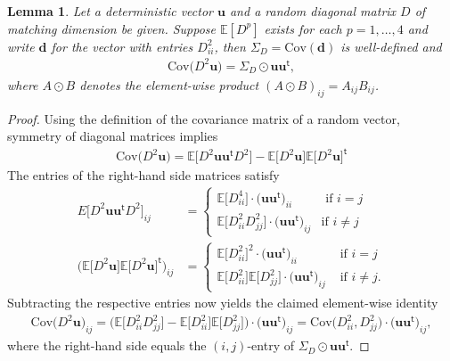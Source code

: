 \documentclass{article}
\newcommand*{\E}{\mathbb{E}} %
\newcommand*{\bfd}{\mathbf{d}}
\newcommand*{\bfu}{\mathbf{u}}
\newcommand*{\tran}{^{\mathsf{t}}}
\newcommand*{\Cov}{\mathrm{Cov}}
\newtheorem{lemma}{Lemma}[section]
\begin{document}
\begin{lemma}
  \label{lem::cov_diag}
  Let a deterministic vector $\bfu$ and a random diagonal matrix $D$ of matching
  dimension be given. Suppose $\E[D^p]$ exists for each $p = 1, \ldots, 4$ and
  write $\bfd$ for the vector with entries $D_{ii}^2$, then $\Sigma_D =
  \Cov(\bfd)$ is well-defined and \begin{align*}
    \Cov\big(D^2 \bfu\big) = \Sigma_D \odot \bfu \bfu\tran,
  \end{align*} where $A \odot B$ denotes the element-wise product $(A \odot
  B)_{ij} = A_{ij} B_{ij}$.
\end{lemma}

\begin{proof}
  Using the definition of the covariance matrix of a random vector, symmetry of
  diagonal matrices implies \begin{align*}
    \Cov\big(D^2 \bfu\big) = \E\big[D^2 \bfu \bfu\tran D^2\big] - \E\big[D^2
    \bfu\big] \E\big[D^2 \bfu\big]\tran
  \end{align*} The entries of the right-hand side matrices satisfy
  \begin{align*}
    E\big[D^2 \bfu \bfu\tran D^2\big]_{ij} &= \begin{cases}
      \E\big[D^4_{ii}\big] \cdot \big(\bfu \bfu\tran\big)_{ii} & \mbox{ if } i =
      j\\
      \E\big[D^2_{ii} D^2_{jj}\big] \cdot \big(\bfu \bfu\tran\big)_{ij} & \mbox{
      if } i \neq j
    \end{cases}\\
    \Big(\E\big[D^2 \bfu\big] \E\big[D^2 \bfu\big]\tran\Big)_{ij} &=
    \begin{cases}
      \E\big[D^2_{ii}\big]^2 \cdot \big(\bfu \bfu\tran\big)_{ii} & \mbox{ if } i
      = j\\
      \E\big[D^2_{ii}\big] \E\big[D^2_{jj}\big] \cdot \big(\bfu
      \bfu\tran\big)_{ij} & \mbox{ if } i \neq j.
    \end{cases}
  \end{align*} Subtracting the respective entries now yields the claimed
  element-wise identity \begin{align*}
    \Cov\big(D^2 \bfu\big)_{ij} = \Big(\E\big[D^2_{ii} D^2_{jj}\big] -
    \E\big[D_{ii}^2\big] \E\big[D_{jj}^2\big]\Big) \cdot \big(\bfu
    \bfu\tran\big)_{ij} = \Cov\big(D_{ii}^2, D_{jj}^2\big) \cdot \big(\bfu
    \bfu\tran\big)_{ij},
  \end{align*} where the right-hand side equals the $(i, j)$-entry of $\Sigma_D
  \odot \bfu \bfu\tran$.
\end{proof}
\end{document}
